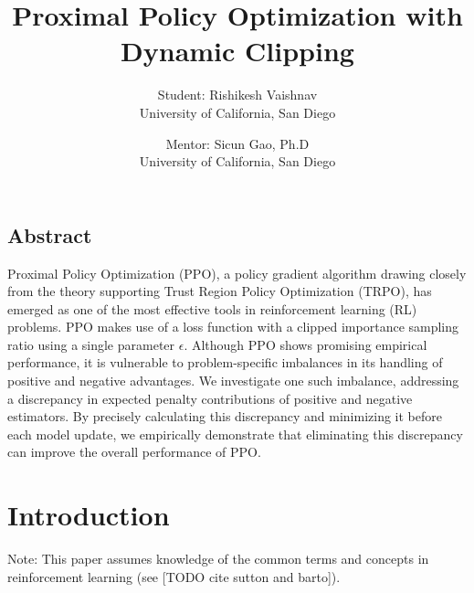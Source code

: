 \documentclass[letterpaper,twocolumn,10pt]{article}
\begin{document}
\date{}

\title{\Large \bf Proximal Policy Optimization with Dynamic Clipping}

\author{
{\rm Student: Rishikesh Vaishnav}\\
University of California, San Diego
\and
{\rm Mentor: Sicun Gao, Ph.D}\\
University of California, San Diego
}

\maketitle

\thispagestyle{empty}

\subsection*{Abstract}
Proximal Policy Optimization (PPO), a policy gradient algorithm drawing closely
from the theory supporting Trust Region Policy Optimization (TRPO), has emerged
as one of the most effective tools in reinforcement learning (RL) problems. PPO
makes use of a loss function with a clipped importance sampling ratio using a
single parameter $\epsilon$. Although PPO shows promising empirical
performance, it is vulnerable to problem-specific imbalances in its handling of
positive and negative advantages. We investigate one such imbalance, addressing
a discrepancy in expected penalty contributions of positive and negative
estimators. By precisely calculating this discrepancy and minimizing it before
each model update, we empirically demonstrate that eliminating this discrepancy
can improve the overall performance of PPO.

\section{Introduction}

Note: This paper assumes knowledge of the common terms and concepts in
reinforcement learning (see [TODO cite sutton and barto]).
\end{document}
